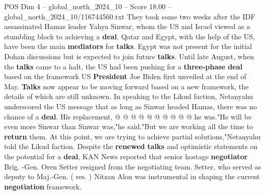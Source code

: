 \begin{textsample}{POS Dim 4 – global\_north\_2024\_10 – Score 18.00 – global\_north\_2024\_10/116744560.txt}
They took some two weeks after the IDF assassinated Hamas leader Yahya Sinwar, whom the US and Israel viewed as a stumbling block to achieving a \textbf{deal}.
Qatar and Egypt, with the help of the US, have been the main \textbf{mediators} for \textbf{talks}.
Egypt was not present for the initial Dohan discussions but is expected to join future \textbf{talks}.
Until late August, when the \textbf{talks} came to a halt, the US had been pushing for a \textbf{three-phase} \textbf{deal} based on the framework US \textbf{President} Joe Biden first unveiled at the end of May. \textbf{Talks} now appear to be moving forward based on a new framework, the details of which are still unknown.
In speaking to the Likud faction, Netanyahu underscored the US message that as long as Sinwar headed Hamas, there was no chance of a \textbf{deal}.
His replacement, @ @ @ @ @ @ @ @ @ @ he was."He will be even more Sinwar than Sinwar was,"he said."But we are working all the time to \textbf{return} them.
At this point, we are trying to achieve partial solutions,"Netanyahu told the Likud faction.
Despite the \textbf{renewed} \textbf{talks} and optimistic statements on the potential for a \textbf{deal}, KAN News reported that senior hostage \textbf{negotiator} Brig. -Gen.
Oren Setter resigned from the negotiating team.
Setter, who served as deputy to Maj.-Gen. ( res. ) Nitzan Alon was instrumental in shaping the current \textbf{negotiation} framework.

\end{textsample}
